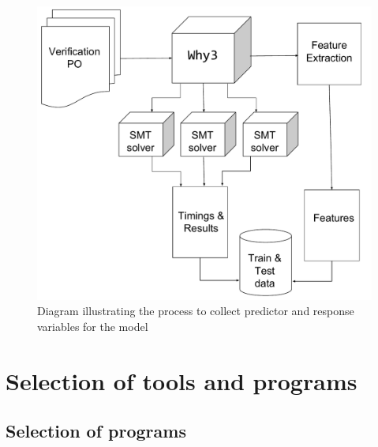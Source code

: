 \begin{figure}
\centering
\includegraphics[width=0.9\linewidth]{Figures/Chapter3}
\caption{Diagram illustrating the process to collect predictor and response variables for the \where model}
\label{fig:Chapter3}
\end{figure}

\section{Selection of tools and programs}
\label{sec:selection}

\subsection{Selection of \why programs}
\label{sub:why3programs}

